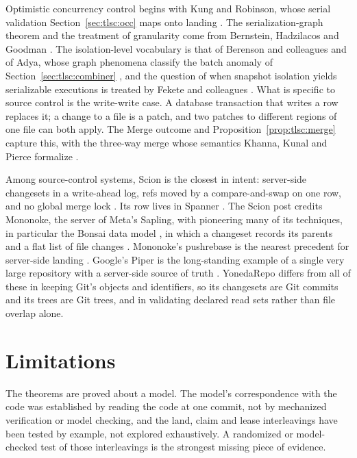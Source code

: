 \documentclass[11pt,letterpaper]{article}
\theoremstyle{definition}
\theoremstyle{remark}
\begin{document}
Optimistic concurrency control begins with Kung and Robinson, whose serial validation Section~\ref{sec:tlsc:occ} maps onto landing \cite{kung1981occ}. The serialization-graph theorem and the treatment of granularity come from Bernstein, Hadzilacos and Goodman \cite{bhg1987}. The isolation-level vocabulary is that of Berenson and colleagues \cite{berenson1995critique} and of Adya, whose graph phenomena classify the batch anomaly of Section~\ref{sec:tlsc:combiner} \cite{adya1999thesis}, and the question of when snapshot isolation yields serializable executions is treated by Fekete and colleagues \cite{fekete2005serializable}. What is specific to source control is the write-write case. A database transaction that writes a row replaces it; a change to a file is a patch, and two patches to different regions of one file can both apply. The Merge outcome and Proposition~\ref{prop:tlsc:merge} capture this, with the three-way merge whose semantics Khanna, Kunal and Pierce formalize \cite{khanna2007diff3}.

Among source-control systems, Scion is the closest in intent: server-side changesets in a write-ahead log, refs moved by a compare-and-swap on one row, and no global merge lock \cite{anthropic2026scion}. Its row lives in Spanner \cite{corbett2012spanner}. The Scion post credits Mononoke, the server of Meta's Sapling, with pioneering many of its techniques, in particular the Bonsai data model \cite{anthropic2026scion}, in which a changeset records its parents and a flat list of file changes \cite{mononokebonsai}. Mononoke's pushrebase is the nearest precedent for server-side landing \cite{mononokepushrebase}. Google's Piper is the long-standing example of a single very large repository with a server-side source of truth \cite{potvin2016piper}. YonedaRepo differs from all of these in keeping Git's objects and identifiers, so its changesets are Git commits and its trees are Git trees, and in validating declared read sets rather than file overlap alone.

\section{Limitations}
\label{sec:tlsc:limits}

The theorems are proved about a model. The model's correspondence with the code was established by reading the code at one commit, not by mechanized verification or model checking, and the land, claim and lease interleavings have been tested by example, not explored exhaustively. A randomized or model-checked test of those interleavings is the strongest missing piece of evidence.
\end{document}
